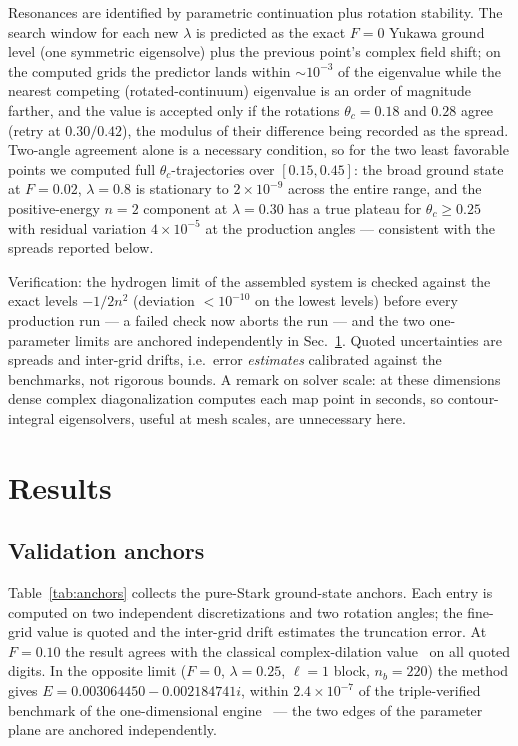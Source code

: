 \documentclass[aps,pra,twocolumn,superscriptaddress,floatfix,longbibliography]{revtex4-2}
\begin{document}
Resonances are identified by parametric continuation plus rotation
stability. The search window for each new $\lambda$ is predicted as
the exact $F=0$ Yukawa ground level (one symmetric eigensolve) plus
the previous point's complex field shift; on the computed grids the
predictor lands within $\sim\!10^{-3}$ of the eigenvalue while the
nearest competing (rotated-continuum) eigenvalue is an order of
magnitude farther, and the value is accepted only if the rotations
$\theta_c=0.18$ and $0.28$ agree (retry at $0.30/0.42$), the modulus
of their difference being recorded as the spread. Two-angle agreement
alone is a necessary condition, so for the two least favorable points
we computed full $\theta_c$-trajectories over $[0.15,0.45]$: the
broad ground state at $F=0.02$, $\lambda=0.8$ is stationary to
$2\times10^{-9}$ across the entire range, and the positive-energy
$n=2$ component at $\lambda=0.30$ has a true plateau for
$\theta_c\geq0.25$ with residual variation $4\times10^{-5}$ at the
production angles --- consistent with the spreads reported below.

Verification: the hydrogen limit of the assembled system is checked
against the exact levels $-1/2n^{2}$ (deviation $<10^{-10}$ on the
lowest levels) before every production run --- a failed check now
aborts the run --- and the two one-parameter limits are anchored
independently in Sec.~\ref{sec:results}. Quoted uncertainties are
spreads and inter-grid drifts, i.e.\ error \emph{estimates} calibrated
against the benchmarks, not rigorous bounds. A remark on solver
scale: at these dimensions dense complex diagonalization computes
each map point in seconds, so contour-integral eigensolvers, useful
at mesh scales, are unnecessary here.

\section{Results}
\label{sec:results}

\subsection{Validation anchors}

Table~\ref{tab:anchors} collects the pure-Stark ground-state anchors.
Each entry is computed on two independent discretizations and two
rotation angles; the fine-grid value is quoted and the inter-grid
drift estimates the truncation error. At $F=0.10$ the result agrees
with the classical complex-dilation value~\cite{Kolosov1987,
Telnov1989,Jentschura2001} on all quoted digits. In the opposite
limit ($F=0$, $\lambda=0.25$, $\ell=1$ block, $n_b=220$) the method
gives $E=0.003064450-0.002184741i$, within $2.4\times10^{-7}$ of the
triple-verified benchmark of the one-dimensional
engine~\cite{companionNR} --- the two edges of the parameter plane
are anchored independently.
\end{document}
